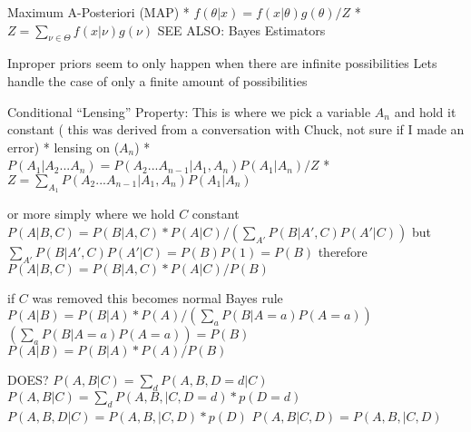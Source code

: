 Maximum A-Posteriori (MAP)
    * $f(\theta | x) = f(x | \theta) g(\theta) / Z$
    * $Z = \sum_{\nu \in \Theta} f(x | \nu) g(\nu)$
    SEE ALSO: Bayes Estimators

Inproper priors seem to only happen when there are infinite possibilities
Lets handle the case of only a finite amount of possibilities

Conditional ``Lensing'' Property:
    This is where we pick a variable $A_{n}$ and hold it constant
    ( this was derived from a conversation with Chuck, not sure if I made an error)
    * lensing on ($A_n$)
    * $P(A_1 | A_2 ... A_n) = P(A_2 ... A_{n-1} | A_1, A_n) P(A_1 | A_n) / Z$
    * $Z = \sum_{A_1} P(A_2 ... A_{n-1} | A_1, A_n) P(A_1 | A_n)$
    
    or more simply where we hold $C$ constant
    $P(A | B, C) = P(B | A, C) * P(A | C) / (\sum_{A'} P(B | A', C) P(A' | C))$
    but 
    $\sum_{A'} P(B | A', C) P(A' | C) = P(B) P(1) = P(B)$
    therefore
    $P(A | B, C) = P(B | A, C) * P(A | C) / P(B)$

    if $C$ was removed this becomes normal Bayes rule
    $P(A | B) = P(B | A) * P(A) / (\sum_{a} P(B | A=a) P(A=a))$
    $(\sum_{a} P(B | A=a) P(A=a)) = P(B)$
    $P(A | B) = P(B | A) * P(A) / P(B)$


    DOES?
    $P(A, B | C) = \sum_{d} P(A, B, D=d | C)$
    $P(A, B | C) = \sum_{d} P(A, B, | C, D=d) * p(D=d)$
    $P(A, B, D | C) = P(A, B, | C, D) * p(D)$
    $P(A, B | C, D) = P(A, B, | C, D) $
